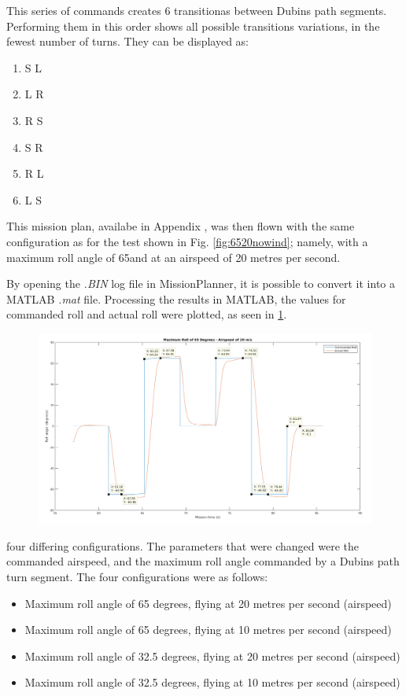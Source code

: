 This series of commands creates 6 transitionas between Dubins path segments. Performing them in this order shows all possible transitions variations, in the fewest number of turns. They can be displayed as:

\begin{enumerate}
	\item S \textrightarrow L
	\item L \textrightarrow R
	\item R \textrightarrow S
	\item S \textrightarrow R
	\item R \textrightarrow L
	\item L \textrightarrow S
\end{enumerate}

This mission plan, availabe in Appendix %
, was then flown with the same configuration as for the test shown in Fig. \ref{fig:6520nowind}; namely, with a maximum roll angle of 65\degree and at an airspeed of 20 metres per second. 

By opening the \textit{.BIN} log file in MissionPlanner, it is possible to convert it into a MATLAB \textit{.mat} file. Processing the results in MATLAB, the values for commanded roll and actual roll were plotted, as seen in \ref{fig:6520cursors}. 

\begin{figure}[htbp!] 
\centering    
\includegraphics[angle=90,height=0.9\textheight]{65_20_cursors}
\caption[]{}
\label{fig:6520cursors}
\end{figure} 



four differing configurations. The parameters that were changed were the commanded airspeed, and the maximum roll angle commanded by a Dubins path turn segment. The four configurations were as follows:

\begin{itemize}
	\item Maximum roll angle of 65 degrees, flying at 20 metres per second (airspeed)
	\item Maximum roll angle of 65 degrees, flying at 10 metres per second (airspeed)
	\item Maximum roll angle of 32.5 degrees, flying at 20 metres per second (airspeed)
	\item Maximum roll angle of 32.5 degrees, flying at 10 metres per second (airspeed)
\end{itemize}

